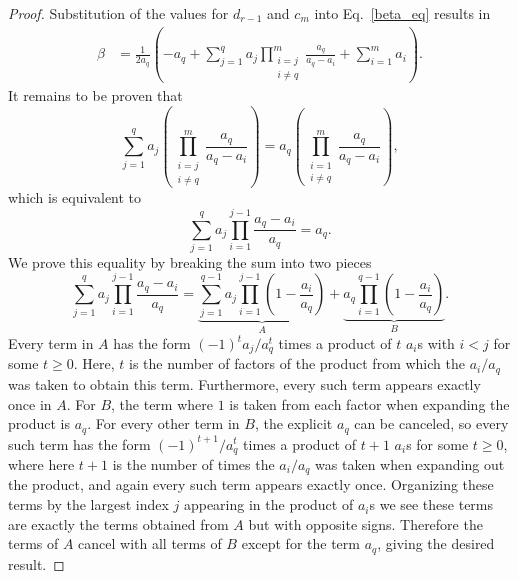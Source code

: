\documentclass[10pt,a4paper]{amsart}
\begin{document}
\begin{proof}
Substitution of the values for $d_{r-1}$ and $c_m$ 
into Eq.~\eqref{beta_eq}  results in 
\begin{align*} \beta &= \frac{1}{2 a_q} \left( -a_q + \sum_{j=1}^q a_j \prod_{\substack{i=j\\ i\neq q}}^{m} \frac{a_q}{a_q-a_i} + \sum_{i=1}^m a_i \right). \end{align*}
It remains to be proven that 
\[
     \sum_{j=1}^q a_j \left( \prod_{\substack{i=j\\ i\neq q}}^{m}\frac{a_q}{a_q-a_i} \right) = a_q \left( \prod_{\substack{i=1\\ i\neq q}}^{m}\frac{a_q}{a_q-a_i} \right),
\]
which is equivalent to 
    \[
    \sum_{j=1}^q a_j \prod_{i=1}^{j-1}\frac{a_q-a_i}{a_q} = a_q.
    \]
We prove this equality by breaking the sum into two pieces
    \[
    \sum_{j=1}^q a_j \prod_{i=1}^{j-1}\frac{a_q-a_i}{a_q} = \underbrace{\sum_{j=1}^{q-1} a_j \prod_{i=1}^{j-1}\left(1 - \frac{a_i}{a_q}\right)}_A + \underbrace{a_q \prod_{i=1}^{q-1}\left(1 - \frac{a_i}{a_q}\right)}_B.
    \]
    Every term in $A$ has the form $(-1)^ta_j/a_q^t$ times a product of $t$ $a_i$s with $i<j$ for some $t\geq 0$. Here, $t$ is the number of factors of the product from which the $a_i/a_q$ was taken to obtain this term.  Furthermore, every such term appears exactly once in $A$.  For $B$, the term where $1$ is taken from each factor when expanding the product is $a_q$.  For every other term in $B$, the explicit $a_q$ can be canceled, so every such term has the form $(-1)^{t+1}/a_q^t$ times a product of $t+1$ $a_i$s for some $t\geq 0$, where here $t+1$ is the number of times the $a_i/a_q$ was taken when expanding out the product, and again every such term appears exactly once. Organizing these terms by the largest index $j$ appearing in the product of $a_i$s we see these terms are exactly the terms obtained from $A$ but with opposite signs.  Therefore the terms of $A$ cancel with all terms of $B$ except for the term $a_q$, giving the desired result.
\end{proof}
\end{document}
